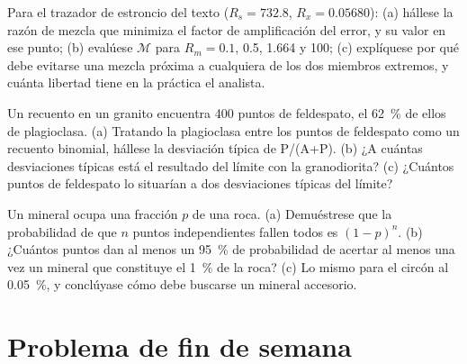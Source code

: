 \begin{exercise}[$\star\star\star$]\label{exo:b2:field-lab-methods-2:10}
Para el trazador de estroncio del texto ($R_s = 732.8$, $R_x = 0.05680$): (a) hállese la razón de mezcla
que minimiza el factor de amplificación del error, y su valor en ese punto; (b) evalúese $\mathcal M$ para
$R_m = 0.1$, 0.5, 1.664 y 100; (c) explíquese por qué debe evitarse una mezcla próxima a cualquiera de los dos miembros
extremos, y cuánta libertad tiene en la práctica el analista.
\end{exercise}

\begin{exercise}[$\star\star\star$]\label{exo:b2:field-lab-methods-2:11}
Un recuento en un granito encuentra 400 puntos de feldespato, el \qty{62}{\percent} de ellos de plagioclasa. (a) Tratando la
plagioclasa entre los puntos de feldespato como un recuento binomial, hállese la desviación típica de
P/(A+P). (b) ¿A cuántas desviaciones típicas está el resultado del límite con la granodiorita? (c) ¿Cuántos
puntos de feldespato lo situarían a dos desviaciones típicas del límite?
\end{exercise}

\begin{exercise}[$\star\star\star$]\label{exo:b2:field-lab-methods-2:12}
Un mineral ocupa una fracción $p$ de una roca. (a) Demuéstrese que la probabilidad de que $n$ puntos independientes
fallen todos es $(1-p)^n$. (b) ¿Cuántos puntos dan al menos un \qty{95}{\percent} de probabilidad de
acertar al menos una vez un mineral que constituye el \qty{1}{\percent} de la roca? (c) Lo mismo para el circón al
\qty{0.05}{\percent}, y conclúyase cómo debe buscarse un mineral accesorio.
\end{exercise}

\section*{Problema de fin de semana}

